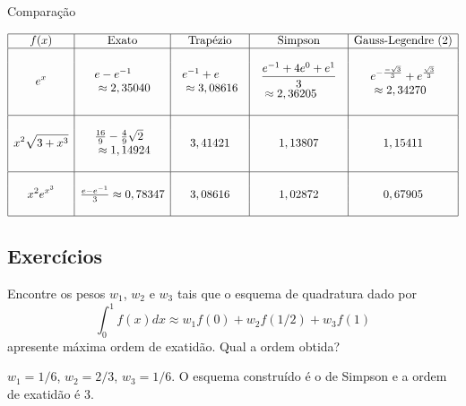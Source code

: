 \begin{ex} Comparação
  \begin{small}
$$
\begin{array}{|c|c|c|c|c|}
\hline
f(x)&\hbox{Exato}&\hbox{Trapézio} &\hbox{Simpson} & \hbox{Gauss-Legendre (2)}\\
\hline
&&&&\\
\displaystyle e^{x}&\displaystyle \begin{array}{l}e-e^{-1}\\~\approx 2,35040\end{array}  & \displaystyle \begin{array}{l}e^{-1}+e \\ ~\approx 3,08616 \end{array}& \begin{array}{l}\displaystyle \frac{e^{-1}+4e^{0}+e^{1}}{3}\\ ~\approx  2,36205\end{array} & \begin{array}{l}\displaystyle e^{-\frac{-\sqrt{3}}{3}}+e^{\frac{\sqrt{3}}{3}}\\ ~\approx   2,34270\end{array}\\
&&&&\\
 \hline
&&&&\\
\displaystyle x^2\sqrt{3+x^3}& \begin{array}{l}\frac{16}{9}-\frac{4}{9}\sqrt{2}\\~\approx 1,14924\end{array} & 3,41421  & 1,13807 & 1,15411\\
&&&&\\
 \hline
&&&&\\
  \displaystyle x^2e^{x^3}&\frac{e-e^{-1}}{3}\approx 0,78347 & 3,08616     & 1,02872  & 0,67905\\
&&&&\\
 \hline
    \end{array}
$$    
  \end{small}
\end{ex}

\subsection*{Exercícios}

\begin{Exercise}
Encontre os pesos $w_1$, $w_2$ e $w_3$ tais que o esquema de quadratura dado por
$$\int_{0}^{1}f(x)dx\approx w_1f(0)+w_2f(1/2)+w_3 f(1)$$
apresente máxima ordem de exatidão. Qual a ordem obtida?
\end{Exercise}
\begin{Answer}
  \begin{tiny}
 $w_1=1/6$, $w_2=2/3$, $w_3=1/6$. O esquema construído é o de Simpson e a ordem de exatidão é 3.   
  \end{tiny}
\end{Answer}

